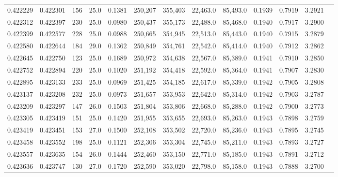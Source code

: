 \begin{tabular}{rrrrrrrrrrrrr}
0.422229 & 0.422301 &   156 & 25.0 &                                     0.1381 & 250,207 & 355,403 &  22,463.0 &  85,493.0 & 0.1939 & 0.7919 & 3.2921 \\
0.422312 & 0.422397 &   230 & 25.0 &                                     0.0980 & 250,437 & 355,173 &  22,488.0 &  85,468.0 & 0.1940 & 0.7917 & 3.2900 \\
0.422399 & 0.422577 &   228 & 25.0 &                                     0.0988 & 250,665 & 354,945 &  22,513.0 &  85,443.0 & 0.1940 & 0.7915 & 3.2879 \\
0.422580 & 0.422644 &   184 & 29.0 &                                     0.1362 & 250,849 & 354,761 &  22,542.0 &  85,414.0 & 0.1940 & 0.7912 & 3.2862 \\
0.422645 & 0.422750 &   123 & 25.0 &                                     0.1689 & 250,972 & 354,638 &  22,567.0 &  85,389.0 & 0.1941 & 0.7910 & 3.2850 \\
0.422752 & 0.422894 &   220 & 25.0 &                                     0.1020 & 251,192 & 354,418 &  22,592.0 &  85,364.0 & 0.1941 & 0.7907 & 3.2830 \\
0.422895 & 0.423133 &   233 & 25.0 &                                     0.0969 & 251,425 & 354,185 &  22,617.0 &  85,339.0 & 0.1942 & 0.7905 & 3.2808 \\
0.423137 & 0.423208 &   232 & 25.0 &                                     0.0973 & 251,657 & 353,953 &  22,642.0 &  85,314.0 & 0.1942 & 0.7903 & 3.2787 \\
0.423209 & 0.423297 &   147 & 26.0 &                                     0.1503 & 251,804 & 353,806 &  22,668.0 &  85,288.0 & 0.1942 & 0.7900 & 3.2773 \\
0.423305 & 0.423419 &   151 & 25.0 &                                     0.1420 & 251,955 & 353,655 &  22,693.0 &  85,263.0 & 0.1943 & 0.7898 & 3.2759 \\
0.423419 & 0.423451 &   153 & 27.0 &                                     0.1500 & 252,108 & 353,502 &  22,720.0 &  85,236.0 & 0.1943 & 0.7895 & 3.2745 \\
0.423458 & 0.423552 &   198 & 25.0 &                                     0.1121 & 252,306 & 353,304 &  22,745.0 &  85,211.0 & 0.1943 & 0.7893 & 3.2727 \\
0.423557 & 0.423635 &   154 & 26.0 &                                     0.1444 & 252,460 & 353,150 &  22,771.0 &  85,185.0 & 0.1943 & 0.7891 & 3.2712 \\
0.423636 & 0.423747 &   130 & 27.0 &                                     0.1720 & 252,590 & 353,020 &  22,798.0 &  85,158.0 & 0.1943 & 0.7888 & 3.2700 \\

\end{tabular}
